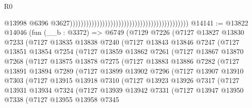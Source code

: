 \begin{lexlean}{R0}
\begin{coremodule}
                                                                                            @13998
                                                                                            @6396
                                                                                            @3627))))))))))))))))))))))))))))))))))))))))))))
@14141 := @13822
    @14046
    (fun (__b : @3372) =>
    @6749
      (@7129
        @7226
        (@7127
          @13827
          @13830
          @7233
          (@7127
            @13835
            @13838
            @7240
            (@7127
              @13843
              @13846
              @7247
              (@7127
                @13851
                @13854
                @7254
                (@7127
                  @13859
                  @13862
                  @7261
                  (@7127
                    @13867
                    @13870
                    @7268
                    (@7127
                      @13875
                      @13878
                      @7275
                      (@7127
                        @13883
                        @13886
                        @7282
                        (@7127
                          @13891
                          @13894
                          @7289
                          (@7127
                            @13899
                            @13902
                            @7296
                            (@7127
                              @13907
                              @13910
                              @7303
                              (@7127
                                @13915
                                @13918
                                @7310
                                (@7127
                                  @13923
                                  @13926
                                  @7317
                                  (@7127
                                    @13931
                                    @13934
                                    @7324
                                    (@7127
                                      @13939
                                      @13942
                                      @7331
                                      (@7127
                                        @13947
                                        @13950
                                        @7338
                                        (@7127
                                          @13955
                                          @13958
                                          @7345

\end{coremodule}
\end{lexlean}

